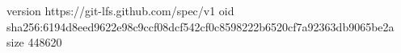 version https://git-lfs.github.com/spec/v1
oid sha256:6194d8eed9622e98c9ccf08dcf542cf0c8598222b6520cf7a92363db9065be2a
size 448620
